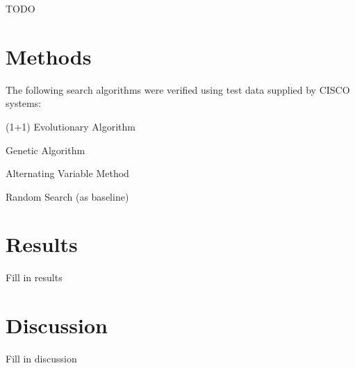 \documentclass[twoside]{article}
\begin{document}
\begin{multicols}{2}
TODO

\section{Methods}

The following search algorithms were verified using test data supplied by CISCO systems:

\begin{compactitem}
\item (1+1) Evolutionary Algorithm
\item Genetic Algorithm
\item Alternating Variable Method
\item Random Search (as baseline)
\end{compactitem}


\section{Results}

Fill in results


\section{Discussion}

Fill in discussion

\end{multicols}
\end{document}
